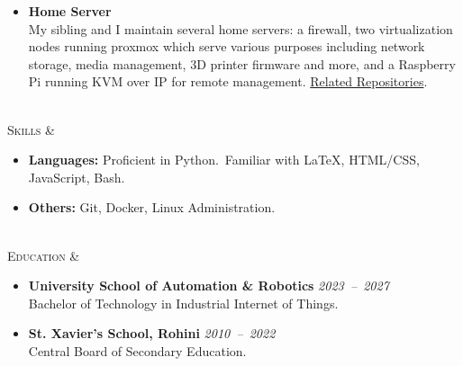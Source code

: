 \documentclass[11pt]{article}
\begin{document}
\begin{tblr}
\begin{itemize}[topsep=0pt,leftmargin=15pt]
            \item \textbf{Home Server}\\
            My sibling and I maintain several home servers: a firewall, two virtualization nodes running proxmox which
            serve various purposes including network storage, media management, 3D printer firmware and more, and a
            Raspberry Pi running KVM over IP for remote management.
            \href{https://github.com/xserv-labs}{\color{blue}Related Repositories}.\
        \end{itemize}
        \\
        \textsc{\large Skills} &
        \vspace*{-1.5\topsep}
        \begin{itemize}[topsep=0pt,leftmargin=15pt]
            \item \textbf{Languages:} Proficient in Python.\ Familiar with \LaTeX, HTML/CSS, JavaScript, Bash.
            \item \textbf{Others:} Git, Docker, Linux Administration.
        \end{itemize}
        \\
        \textsc{\large Education} &
        \vspace*{-1.5\topsep}
        \begin{itemize}[topsep=0pt,leftmargin=15pt]
            \item \textbf{University School of Automation \& Robotics} \hfill \textit{2023~--~2027} \\
            Bachelor of Technology in Industrial Internet of Things.
            \item \textbf{St. Xavier's School, Rohini} \hfill \textit{2010~--~2022} \\
            Central Board of Secondary Education.
        \end{itemize}
    \end{tblr}
\end{document}
